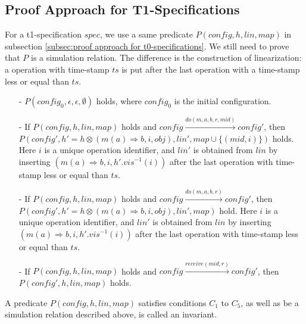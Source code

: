 \subsection{Proof Approach for T1-Specifications}
\label{subsec:proof approach for t1-specifications}

For a t1-specification $\mathit{spec}$, we use a same predicate $P(\mathit{config},h,\mathit{lin},\mathit{map})$ in subsection \ref{subsec:proof approach for t0-specifications}. We still need to prove that $P$ is a simulation relation. The difference is the construction of linearization: a operation with time-stamp $\mathit{ts}$ is put after the last operation with a time-stamp less or equal than $\mathit{ts}$.

\begin{itemize}
\setlength{\itemsep}{0.5pt}
\item[-] $P(\mathit{config}_0,\epsilon,\epsilon,\emptyset)$ holds, where $\mathit{config}_0$ is the initial configuration.

\item[-] If $P(\mathit{config},h,\mathit{lin},\mathit{map})$ holds and $\mathit{config} {\xrightarrow{\mathit{do}(m,a,b,r,\mathit{mid})}} \mathit{config}'$, then $P(\mathit{config}', h' = h \otimes (m(a) \Rightarrow b,i,\mathit{obj}),\mathit{lin}',\mathit{map} \cup \{ (\mathit{mid}, i) \})$ holds. Here $i$ is a unique operation identifier, and $\mathit{lin}'$ is obtained from $\mathit{lin}$ by inserting $(m(a) \Rightarrow b,i,h'.\mathit{vis}^{-1}(i))$ after the last operation with time-stamp less or equal than $\mathit{ts}$.

\item[-] If $P(\mathit{config},h,\mathit{lin},\mathit{map})$ holds and $\mathit{config} {\xrightarrow{\mathit{do}(m,a,b,r)}} \mathit{config}'$, then $P(\mathit{config}',h' = h \otimes (m(a) \Rightarrow b,i,\mathit{obj}),\mathit{lin}',\mathit{map})$ hold. Here $i$ is a unique operation identifier, and $\mathit{lin}'$ is obtained from $\mathit{lin}$ by inserting $(m(a) \Rightarrow b,i,h'.\mathit{vis}^{-1}(i))$ after the last operation with time-stamp less or equal than $\mathit{ts}$.

\item[-] If $P(\mathit{config},h,\mathit{lin},\mathit{map})$ holds and $\mathit{config} {\xrightarrow{\mathit{receive}(\mathit{mid},r)}} \mathit{config}'$, then $P(\mathit{config}',h,\mathit{lin},\mathit{map})$ holds.
\end{itemize}

A predicate $P(\mathit{config},h,\mathit{lin},\mathit{map})$ satisfies conditions $C_1$ to $C_5$, as well as be a simulation relation described above, is called an invariant. 

